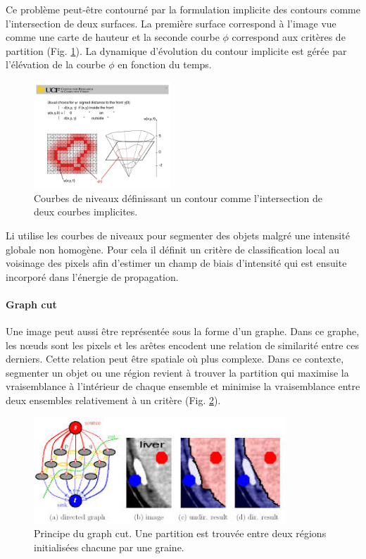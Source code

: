       Ce problème peut-être contourné par la formulation implicite des contours comme l'intersection de deux surfaces. La première surface correspond à l'image vue comme une carte de hauteur et la seconde courbe $\phi$ correspond aux critères de partition (Fig. \ref{fig:level_set}). La dynamique d'évolution du contour implicite est gérée par l'élévation de la courbe $\phi$ en fonction du temps. 

      \begin{figure}[h]
        \centering
        \includegraphics[height=4cm]{Images/level_set_active_contour.jpeg}
        \caption{Courbes de niveaux définissant un contour comme l'intersection de deux courbes implicites.}
        \label{fig:level_set}
      \end{figure}

      Li \cite{Li2011_mri_level_set} utilise les courbes de niveaux pour segmenter des objets malgré une intensité globale non homogène. Pour cela il définit un critère de classification local au voisinage des pixels afin d'estimer un champ de biais d'intensité qui est ensuite incorporé dans l'énergie de propagation.

      \paragraph{Graph cut}

      Une image peut aussi être représentée sous la forme d'un graphe. Dans ce graphe, les nœuds sont les pixels et les arêtes encodent une relation de similarité entre ces derniers. Cette relation peut être spatiale où plus complexe. Dans ce contexte, segmenter un objet ou une région revient à trouver la partition qui maximise la vraisemblance à l'intérieur de chaque ensemble et minimise la vraisemblance entre deux ensembles relativement à un critère (Fig. \ref{fig:graph_cut}).

      \begin{figure}[h]
        \centering
        \includegraphics[height=4cm]{Images/graph_cut.jpeg}
        \caption{Principe du graph cut. Une partition est trouvée entre deux régions initialisées chacune par une graine.}
        \label{fig:graph_cut}
      \end{figure}

